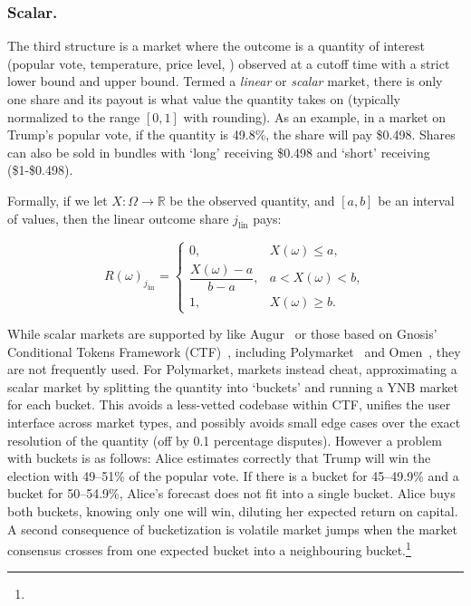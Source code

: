 \subsubsection{Scalar.}

The third structure is a market where the outcome is a quantity of interest (\eg popular vote, temperature, price level, \etc) observed at a cutoff time with a strict lower bound and upper bound. Termed a \textit{linear} or \textit{scalar} market, there is only one share and its payout is what value the quantity takes on (typically normalized to the range $[0,1]$ with rounding). As an example, in a market on Trump's popular vote, if the quantity is 49.8\%, the share will pay \$0.498. Shares can also be sold in bundles with `long' receiving \$0.498 and `short' receiving (\$1-\$0.498).

Formally, if we let $X:\Omega\to\mathbb{R}$ be the observed quantity, and $[a,b]$ be an interval of values, then the linear outcome share $j_{\mathrm{lin}}$ pays:

\begin{equation}
R(\omega)_{j_{\mathrm{lin}}}=
\begin{cases}
0, & X(\omega)\le a,\\
\dfrac{X(\omega)-a}{\,b-a\,}, & a< X(\omega) < b,\\
1, & X(\omega)\ge b.
\end{cases}
\end{equation}

While scalar markets are supported by \depms like Augur~\cite{AKPWZ15,AKPWZ19} or those based on Gnosis' Conditional Tokens Framework (CTF)~\cite{ctf}, including Polymarket~\cite{poly} and Omen~\cite{Omen_docs}, they are not frequently used. For Polymarket, markets instead cheat, approximating a scalar market  by splitting the quantity into `buckets' and running a YNB market for each bucket. This avoids a less-vetted codebase within CTF, unifies the user interface across market types, and possibly avoids small edge cases over the exact resolution of the quantity (\eg off by 0.1 percentage disputes). However a problem with buckets is as follows: Alice estimates correctly that Trump will win the election with 49--51\% of the popular vote. If there is a bucket for 45--49.9\% and a bucket for 50--54.9\%, Alice's forecast does not fit into a single bucket. Alice buys both buckets, knowing only one will win, diluting her expected return on capital. A second consequence of bucketization is volatile market jumps when the market consensus crosses from one expected bucket into a neighbouring bucket.\footnote{}  

